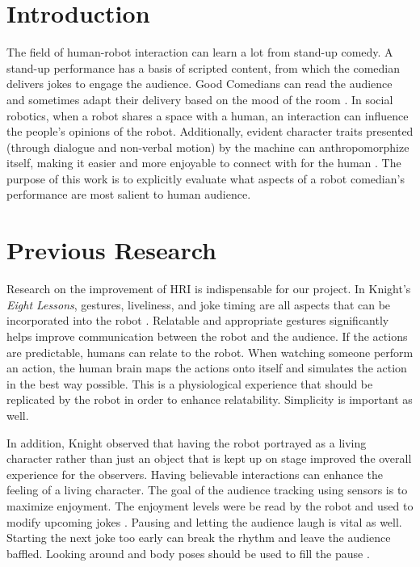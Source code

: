 \documentclass[onecolumn, draftclsnofoot,10pt, compsoc]{IEEEtran}
\begin{document}
\section{Introduction}
The field of human-robot interaction can learn a lot from stand-up comedy. A stand-up performance has a basis of scripted content, from which the comedian delivers jokes to engage the audience. Good Comedians can read the audience and sometimes adapt their delivery based on the mood of the room \cite{talkingFunny}. In social robotics, when a robot shares a space with a human, an interaction can influence the people's opinions of the robot. Additionally, evident character traits presented (through dialogue and non-verbal motion) by the machine can anthropomorphize itself, making it easier and more enjoyable to connect with for the human \cite{KnightEightLessons:2011}. The purpose of this work is to explicitly evaluate what aspects of a robot comedian's performance are most salient to human audience.


\section{Previous Research}

Research on the improvement of HRI is indispensable for our project. In Knight's \textit{Eight Lessons}, gestures, liveliness, and joke timing are all aspects that can be incorporated into the robot {\cite{KnightEightLessons:2011}}.
Relatable and appropriate gestures significantly helps improve communication between the robot and the audience. If the actions are predictable, humans can relate to the robot.
When watching someone perform an action, the human brain maps the actions onto itself and simulates the action in the best way possible. This is a physiological experience that should be replicated by the robot in order to enhance relatability. Simplicity is important as well. {\cite{KnightEightLessons:2011}}

In addition, Knight observed that having the robot portrayed as a living character rather than just an object that is kept up on stage improved the overall experience for the observers. Having believable interactions can enhance the feeling of a living character.
The goal of the audience tracking using sensors is to maximize enjoyment. The enjoyment levels were be read by the robot and used to modify upcoming jokes {\cite{KnightEightLessons:2011}}. Pausing and letting the audience laugh is vital as well. Starting the next joke too early can break the rhythm and leave the audience baffled. Looking around and body poses should be used to fill the pause {\cite{KnightEightLessons:2011}}.
\end{document}
